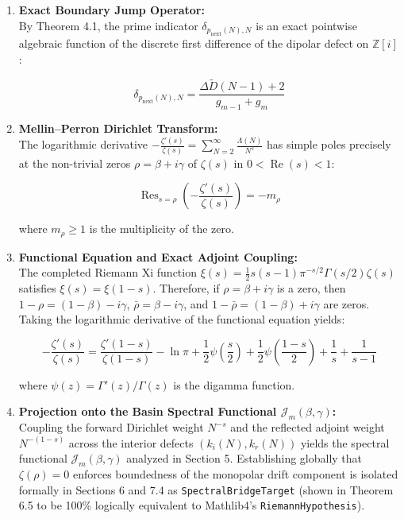 \documentclass[
  11pt,
]{article}
\begin{document}
\begin{enumerate}
\def\labelenumi{\arabic{enumi}.}
\item
  \textbf{Exact Boundary Jump Operator:}\\
  By Theorem 4.1, the prime indicator \(\delta_{p_{\text{next}}(N), N}\)
  is an exact pointwise algebraic function of the discrete first
  difference of the dipolar defect on \(\mathbb{Z}[i]\):

  \[\delta_{p_{\text{next}}(N), N} = \frac{\Delta \widetilde{D}(N-1) + 2}{g_{m-1} + g_m}\]
\item
  \textbf{Mellin--Perron Dirichlet Transform:}\\
  The logarithmic derivative
  \(-\frac{\zeta'(s)}{\zeta(s)} = \sum_{N=2}^\infty \frac{\Lambda(N)}{N^s}\)
  has simple poles precisely at the non-trivial zeros
  \(\rho = \beta + i\gamma\) of \(\zeta(s)\) in
  \(0 < \operatorname{Re}(s) < 1\):

  \[\operatorname{Res}_{s = \rho} \left( -\frac{\zeta'(s)}{\zeta(s)} \right) = -m_\rho\]

  where \(m_\rho \ge 1\) is the multiplicity of the zero.
\item
  \textbf{Functional Equation and Exact Adjoint Coupling:}\\
  The completed Riemann Xi function
  \(\xi(s) = \frac{1}{2}s(s-1)\pi^{-s/2}\Gamma(s/2)\zeta(s)\) satisfies
  \(\xi(s) = \xi(1-s)\). Therefore, if \(\rho = \beta + i\gamma\) is a
  zero, then \(1 - \rho = (1-\beta) - i\gamma\),
  \(\bar{\rho} = \beta - i\gamma\), and
  \(1 - \bar{\rho} = (1-\beta) + i\gamma\) are zeros. Taking the
  logarithmic derivative of the functional equation yields:

  \[-\frac{\zeta'(s)}{\zeta(s)} = \frac{\zeta'(1-s)}{\zeta(1-s)} - \ln \pi + \frac{1}{2}\psi\left(\frac{s}{2}\right) + \frac{1}{2}\psi\left(\frac{1-s}{2}\right) + \frac{1}{s} + \frac{1}{s-1}\]

  where \(\psi(z) = \Gamma'(z)/\Gamma(z)\) is the digamma function.
\item
  \textbf{Projection onto the Basin Spectral Functional
  \(\mathcal{J}_m(\beta, \gamma)\):}\\
  Coupling the forward Dirichlet weight \(N^{-s}\) and the reflected
  adjoint weight \(N^{-(1-s)}\) across the interior defects
  \((k_i(N), k_r(N))\) yields the spectral functional
  \(\mathcal{J}_m(\beta, \gamma)\) analyzed in Section 5. Establishing
  globally that \(\zeta(\rho) = 0\) enforces boundedness of the
  monopolar drift component is isolated formally in Sections 6 and 7.4
  as \texttt{SpectralBridgeTarget} (shown in Theorem 6.5 to be 100\%
  logically equivalent to Mathlib4's \texttt{RiemannHypothesis}).
\end{enumerate}
\end{document}
